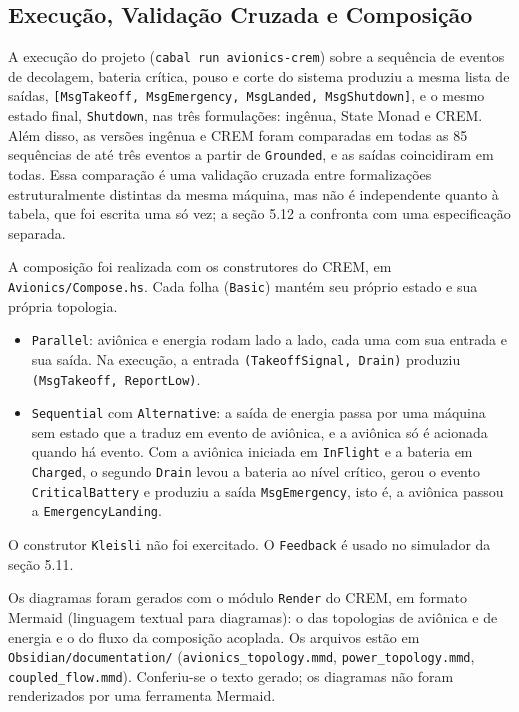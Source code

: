 \documentclass[12pt,a4paper]{article}
\begin{document}
\subsection{Execução, Validação Cruzada e Composição}

A execução do projeto (\texttt{cabal run avionics-crem}) sobre a sequência de eventos de decolagem, bateria crítica, pouso e corte do sistema produziu a mesma lista de saídas, \texttt{[MsgTakeoff, MsgEmergency, MsgLanded, MsgShutdown]}, e o mesmo estado final, \texttt{Shutdown}, nas três formulações: ingênua, State Monad e CREM. Além disso, as versões ingênua e CREM foram comparadas em todas as 85 sequências de até três eventos a partir de \texttt{Grounded}, e as saídas coincidiram em todas. Essa comparação é uma validação cruzada entre formalizações estruturalmente distintas da mesma máquina, mas não é independente quanto à tabela, que foi escrita uma só vez; a seção 5.12 a confronta com uma especificação separada.

A composição foi realizada com os construtores do CREM, em \texttt{Avionics/Compose.hs}. Cada folha (\texttt{Basic}) mantém seu próprio estado e sua própria topologia.

\begin{itemize}
\item \texttt{Parallel}: aviônica e energia rodam lado a lado, cada uma com sua entrada e sua saída. Na execução, a entrada \texttt{(TakeoffSignal, Drain)} produziu \texttt{(MsgTakeoff, ReportLow)}.
\item \texttt{Sequential} com \texttt{Alternative}: a saída de energia passa por uma máquina sem estado que a traduz em evento de aviônica, e a aviônica só é acionada quando há evento. Com a aviônica iniciada em \texttt{InFlight} e a bateria em \texttt{Charged}, o segundo \texttt{Drain} levou a bateria ao nível crítico, gerou o evento \texttt{CriticalBattery} e produziu a saída \texttt{MsgEmergency}, isto é, a aviônica passou a \texttt{EmergencyLanding}.
\end{itemize}

O construtor \texttt{Kleisli} não foi exercitado. O \texttt{Feedback} é usado no simulador da seção 5.11.

Os diagramas foram gerados com o módulo \texttt{Render} do CREM, em formato Mermaid (linguagem textual para diagramas): o das topologias de aviônica e de energia e o do fluxo da composição acoplada. Os arquivos estão em \texttt{Obsidian/documentation/} (\texttt{avionics\_topology.mmd}, \texttt{power\_topology.mmd}, \texttt{coupled\_flow.mmd}). Conferiu-se o texto gerado; os diagramas não foram renderizados por uma ferramenta Mermaid.
\end{document}
